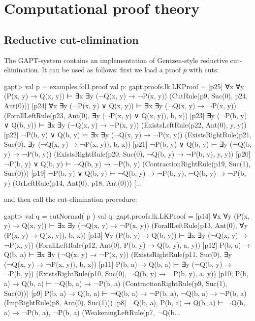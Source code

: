 \documentclass[a4paper,11pt]{book}
\begin{document}
\chapter{Computational proof theory}

\section{Reductive cut-elimination}

The GAPT-system contains an implementation of Gentzen-style reductive
cut-elimination.  It can be used as follows: first we load a proof $p$ with
cuts:

\begin{clilisting}
gapt> val p = examples.fol1.proof
val p: gapt.proofs.lk.LKProof =
[p25] ∀x ∀y (P(x, y) → Q(x, y)) ⊢ ∃x ∃y (¬Q(x, y) → ¬P(x, y))    (CutRule(p9, Suc(0), p24, Ant(0)))
[p24] ∀x ∃y (¬P(x, y) ∨ Q(x, y)) ⊢ ∃x ∃y (¬Q(x, y) → ¬P(x, y))    (ForallLeftRule(p23, Ant(0), ∃y (¬P(x, y) ∨ Q(x, y)), b, x))
[p23] ∃y (¬P(b, y) ∨ Q(b, y)) ⊢ ∃x ∃y (¬Q(x, y) → ¬P(x, y))    (ExistsLeftRule(p22, Ant(0), y, y))
[p22] ¬P(b, y) ∨ Q(b, y) ⊢ ∃x ∃y (¬Q(x, y) → ¬P(x, y))    (ExistsRightRule(p21, Suc(0), ∃y (¬Q(x, y) → ¬P(x, y)), b, x))
[p21] ¬P(b, y) ∨ Q(b, y) ⊢ ∃y (¬Q(b, y) → ¬P(b, y))    (ExistsRightRule(p20, Suc(0), ¬Q(b, y) → ¬P(b, y), y, y))
[p20] ¬P(b, y) ∨ Q(b, y) ⊢ ¬Q(b, y) → ¬P(b, y)    (ContractionRightRule(p19, Suc(1), Suc(0)))
[p19] ¬P(b, y) ∨ Q(b, y) ⊢ ¬Q(b, y) → ¬P(b, y), ¬Q(b, y) → ¬P(b, y)    (OrLeftRule(p14, Ant(0), p18, Ant(0)))
[...

\end{clilisting}
%
and then call the cut-elimination procedure:
\begin{clilisting}
gapt> val q = cutNormal( p )
val q: gapt.proofs.lk.LKProof =
[p14] ∀x ∀y (P(x, y) → Q(x, y)) ⊢ ∃x ∃y (¬Q(x, y) → ¬P(x, y))    (ForallLeftRule(p13, Ant(0), ∀y (P(x, y) → Q(x, y)), b, x))
[p13] ∀y (P(b, y) → Q(b, y)) ⊢ ∃x ∃y (¬Q(x, y) → ¬P(x, y))    (ForallLeftRule(p12, Ant(0), P(b, y) → Q(b, y), a, y))
[p12] P(b, a) → Q(b, a) ⊢ ∃x ∃y (¬Q(x, y) → ¬P(x, y))    (ExistsRightRule(p11, Suc(0), ∃y (¬Q(x, y) → ¬P(x, y)), b, x))
[p11] P(b, a) → Q(b, a) ⊢ ∃y (¬Q(b, y) → ¬P(b, y))    (ExistsRightRule(p10, Suc(0), ¬Q(b, y) → ¬P(b, y), a, y))
[p10] P(b, a) → Q(b, a) ⊢ ¬Q(b, a) → ¬P(b, a)    (ContractionRightRule(p9, Suc(1), Suc(0)))
[p9] P(b, a) → Q(b, a) ⊢ ¬Q(b, a) → ¬P(b, a), ¬Q(b, a) → ¬P(b, a)    (ImpRightRule(p8, Ant(0), Suc(1)))
[p8] ¬Q(b, a), P(b, a) → Q(b, a) ⊢ ¬Q(b, a) → ¬P(b, a), ¬P(b, a)    (WeakeningLeftRule(p7, ¬Q(b...

\end{clilisting}
\end{document}
